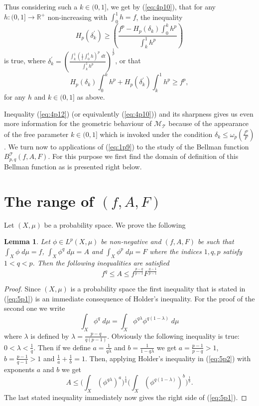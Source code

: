 \documentclass{article}
\numberwithin{equation}{section}
\newtheorem{lemma}{Lemma}[section]
\theoremstyle{definition}
\theoremstyle{remark}
\newcommand{\mc}[1]{\mathcal{#1}}
\begin{document}
Thus considering such a $k\in(0,1]$, we get by (\ref{eq:4p10}), that for any $h:(0,1]\longrightarrow\mathbb{R}^{+}$ non-increasing with $\int_0^1 h = f$, the
inequality
\begin{equation}\label{eq:4p11}
H_p(\delta^{'}_k)\geq \left(\frac{f^p-H_{p}(\delta_k) \int_0^k h^p }{\int_k^1 h^p}\right)
\end{equation}
is true, where $\delta^{'}_k=\left(\frac{\int_k^1 \left(\frac{1}{t} \int_0^t h \right)^p\; dt}{\int_k^1 h^p}\right)^{\frac{1}{p}}$, or that
\begin{equation}\label{eq:4p12}
  H_p(\delta_k)\int_0^k h^p + H_p(\delta^{'}_k)\int_k^1 h^p \geq f^p,
\end{equation}
for any $h$ and $k\in (0,1]$ as above.

Inequality (\ref{eq:4p12}) (or equivalently (\ref{eq:4p10})) and its sharpness gives us even more information for the geometric behaviour of $\mc M_{\mc T}$ because of the appearance of the free parameter $k\in(0,1]$ which is invoked under the condition $\delta_k\leq \omega_p \left(\frac{f^p}{F} \right)$. We turn now to applications of (\ref{eq:1p9}) to the study of the Bellman function $B_{p,q}^{\mc T}(f,A,F)$. For this purpose we first find the domain of definition of this Bellman function as is presented right below.  
%
%
%
%
%
%
\section{The range of $(f,A,F)$ } \label{sec:5}
Let $(X,\mu)$ be a probability space. We prove the following
%
%
\begin{lemma} \label{lem:5p1}
Let $\phi \in L^p(X,\mu)$ be non-negative and $(f,A,F)$ be such that 
$\int_X \phi \; d\mu=f$, $\int_X \phi^q \; d\mu=A$ and $\int_X \phi^p \; d\mu=F$ where the indices $1,q,p$ satisfy $1<q<p$. Then the following inequalities are satisfied
\begin{equation}\label{eq:5p1}
f^q \leq A\leq f^{\frac{p-q}{p-1}}F^{\frac{q-1}{p-1}}
\end{equation}
\end{lemma}

\begin{proof}
Since $(X,\mu)$ is a probability space the first inequality that is stated in (\ref{eq:5p1}) is an immediate consequence of Holder's inequality. For the proof of the second one we write
\begin{equation}\label{eq:5p2}
\int_X \phi^q \; d\mu = \int_X \phi^{q\lambda} \phi^{q(1-\lambda)} \; d\mu 
\end{equation}
where $\lambda$ is defined by $\lambda=\frac{p-q}{q(p-1)}$. Obviously the following inequality is true: $0<\lambda < \frac{1}{q}$. Then if we define $a=\frac{1}{q\lambda}$ and $b=\frac{1}{1-q\lambda}$ we get
$a=\frac{p-1}{p-q}>1$, $b=\frac{p-1}{q-1}>1$ and $\frac{1}{a}+\frac{1}{b}=1$. Then, applying Holder's inequality in (\ref{eq:5p2}) with exponents $a$ and $b$ we get 
$$A\leq \big(\int_X (\phi^{q\lambda})^a\big)^{\frac{1}{a}} \big(\int_X (\phi^{q(1-\lambda)})^b\big)^{\frac{1}{b}}.$$
The last stated inequality immediately now gives the right side of (\ref{eq:5p1}).
\end{proof}
\end{document}
